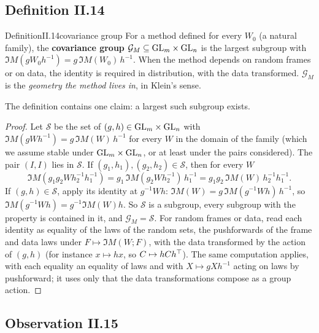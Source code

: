 \subsection{Definition II.14}\label{proof:II.14}

\begin{restate}{Definition}{II.14}{covariance group}
For a method defined for every $W_0$ (a natural family), the \textbf{covariance group}
$\mathcal G_M\subseteq\mathrm{GL}_m\times\mathrm{GL}_n$ is the largest subgroup with $\Im M(gW_0h^{-1})=g\,\Im M(W_0)\,h^{-1}$. When
the method depends on random frames or on data, the identity is required in distribution, with the data transformed.
$\mathcal G_M$ is the \emph{geometry the method lives in}, in Klein's sense.
\end{restate}

The definition contains one claim: a largest such subgroup exists.

\begin{proof}
Let $\mathcal S$ be the set of $(g,h)\in\mathrm{GL}_m\times\mathrm{GL}_n$ with $\Im M(gWh^{-1})=g\,\Im M(W)\,h^{-1}$ for every $W$ in the
domain of the family (which we assume stable under $\mathrm{GL}_m\times\mathrm{GL}_n$, or at least under the pairs considered). The pair
$(I,I)$ lies in $\mathcal S$. If $(g_1,h_1),(g_2,h_2)\in\mathcal S$, then for every $W$
\begin{equation*}
  \Im M(g_1g_2Wh_2^{-1}h_1^{-1})=g_1\,\Im M(g_2Wh_2^{-1})\,h_1^{-1}=g_1g_2\,\Im M(W)\,h_2^{-1}h_1^{-1}.
\end{equation*}
If $(g,h)\in\mathcal S$, apply its identity at $g^{-1}Wh$: $\Im M(W)=g\,\Im M(g^{-1}Wh)\,h^{-1}$, so
$\Im M(g^{-1}Wh)=g^{-1}\Im M(W)h$. So $\mathcal S$ is a subgroup, every subgroup with the property is contained in it, and
$\mathcal G_M=\mathcal S$. For random frames or data, read each identity as equality of the laws of the random sets, the
pushforwards of the frame and data laws under $F\mapsto\Im M(W;F)$, with the data transformed by the action of $(g,h)$
(for instance $x\mapsto hx$, so $C\mapsto hCh^{\top}$). The same computation applies, with each equality an equality of laws and
with $X\mapsto gXh^{-1}$ acting on laws by pushforward; it uses only that the data transformations compose as a group
action.
\end{proof}

\subsection{Observation II.15}\label{proof:II.15}


